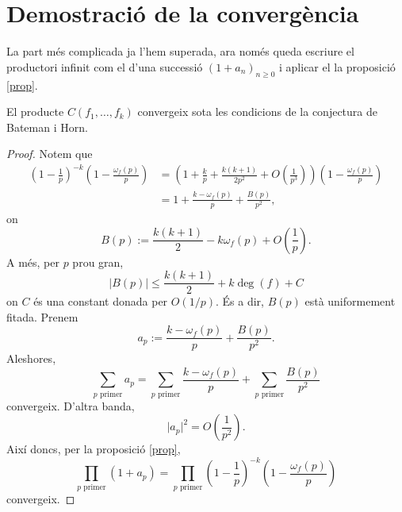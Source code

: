 \section{Demostració de la convergència}

La part més complicada ja l'hem superada, ara només queda escriure el productori infinit com el d'una successió $(1+a_n)_{n\geq 0}$ i aplicar el la proposició \ref{prop}.

\begin{thm}
    El producte $C(f_1,\ldots,f_k)$ convergeix sota les condicions de la conjectura de Bateman i Horn.
\end{thm}
\begin{proof}
    Notem que
    \begin{align*}
    \left(1-\frac{1}{p}\right)^{-k}\left(1-\frac{\omega_f(p)}{p}\right)&=\left(1+\frac{k}{p}+\frac{k(k+1)}{2p^2}+O\left(\frac {1}{p^3}\right)\right)\left(1-\frac{\omega_f(p)}{p}\right)\\
    &=1+\frac{k-\omega_f(p)}{p}+\frac{B(p)}{p^2},
    \end{align*}
    on 
    \[
    B(p):=\frac{k(k+1)}{2}-k\omega_f(p)+O\left(\frac 1 p \right).
    \]
    A més, per $p$ prou gran,
    \[
    \lvert B(p)\rvert\leq \frac{k(k+1)}{2}+k\deg(f)+C
    \]
    on $C$ és una constant donada per $O\left(1/p \right)$. És a dir, $B(p)$ està uniformement fitada. Prenem 
    \[
    a_p:=\frac{k-\omega_f(p)}{p}+\frac{B(p)}{p^2}.
    \]
    Aleshores,
    \[
    \sum_{p \text{ primer}}a_p=\sum_{p\text{ primer}}\frac{k-\omega_f(p)}{p}+\sum_{p\text{ primer}}\frac{B(p)}{p^2}
    \]
    convergeix. D'altra banda, 
    \[
    \lvert a_p\rvert^2=O\left(\frac 1 {p^2}\right).
    \]
    Així doncs, per la proposició \ref{prop}, 
    \[
    \prod_{p\text{ primer}}(1+a_p)=\prod_{p\text{ primer}}\left(1-\frac{1}{p}\right)^{-k}\left(1-\frac{\omega_f(p)}{p}\right)
    \]
    convergeix.
\end{proof}